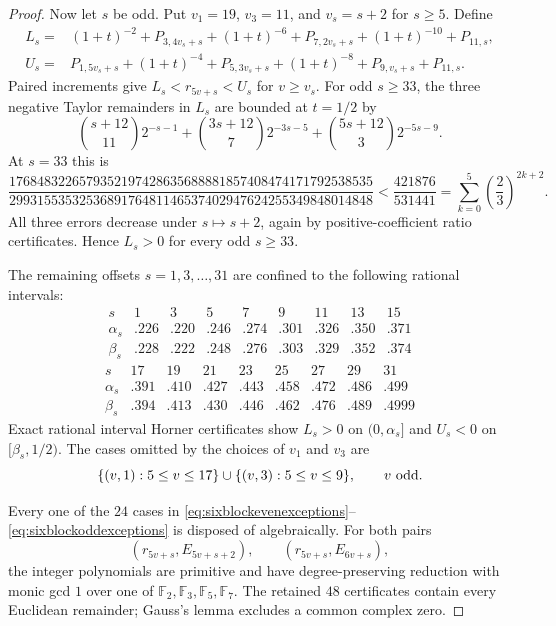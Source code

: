 \documentclass[11pt]{article}
\theoremstyle{remark}
\numberwithin{equation}{section}
\begin{document}
\begin{proof}
Now let $s$ be odd.  Put $v_1=19$, $v_3=11$, and
$v_s=s+2$ for $s\ge5$.  Define
\begin{align*}
 L_s={}&(1+t)^{-2}+P_{3,4v_s+s}+(1+t)^{-6}
                  +P_{7,2v_s+s}+(1+t)^{-10}+P_{11,s},\\
 U_s={}&P_{1,5v_s+s}+(1+t)^{-4}+P_{5,3v_s+s}
                  +(1+t)^{-8}+P_{9,v_s+s}+P_{11,s}.
\end{align*}
Paired increments give $L_s<r_{5v+s}<U_s$ for $v\ge v_s$.
For odd $s\ge33$, the three negative Taylor remainders in $L_s$ are bounded
at $t=1/2$ by
\[
 {s+12\choose11}2^{-s-1}+{3s+12\choose7}2^{-3s-5}
                       +{5s+12\choose3}2^{-5s-9}.
\]
At $s=33$ this is
\[
 \frac{1768483226579352197428635688881857408474171792538535}
 {2993155353253689176481146537402947624255349848014848}
 <\frac{421876}{531441}
 =\sum_{k=0}^{5}\left(\frac23\right)^{2k+2}.
\]
All three errors decrease under $s\mapsto s+2$, again by positive-coefficient
ratio certificates.  Hence $L_s>0$ for every odd $s\ge33$.

The remaining offsets $s=1,3,\ldots,31$ are confined to the following
rational intervals:
\[
\begin{array}{c|rrrrrrrr}
s&1&3&5&7&9&11&13&15\\ \hline
\alpha_s&.226&.220&.246&.274&.301&.326&.350&.371\\
\beta_s &.228&.222&.248&.276&.303&.329&.352&.374
\end{array}
\]
\[
\begin{array}{c|rrrrrrrr}
s&17&19&21&23&25&27&29&31\\ \hline
\alpha_s&.391&.410&.427&.443&.458&.472&.486&.499\\
\beta_s &.394&.413&.430&.446&.462&.476&.489&.4999
\end{array}
\]
Exact rational interval Horner certificates show $L_s>0$ on
$(0,\alpha_s]$ and $U_s<0$ on $[\beta_s,1/2)$.  The cases omitted by the
choices of $v_1$ and $v_3$ are
\begin{equation}\label{eq:sixblockoddexceptions}
 \{(v,1):5\le v\le17\}\cup\{(v,3):5\le v\le9\},
 \qquad v\ \hbox{odd}.
\end{equation}

Every one of the $24$ cases in
\eqref{eq:sixblockevenexceptions}--\eqref{eq:sixblockoddexceptions} is
disposed of algebraically.  For both pairs
\[
 (r_{5v+s},E_{5v+s+2}),\qquad(r_{5v+s},E_{6v+s}),
\]
the integer polynomials are primitive and have degree-preserving reduction
with monic gcd $1$ over one of $\mathbb F_2,\mathbb F_3,\mathbb F_5,
\mathbb F_7$.  The retained $48$ certificates contain every Euclidean
remainder; Gauss's lemma excludes a common complex zero.


\end{proof}
\end{document}
